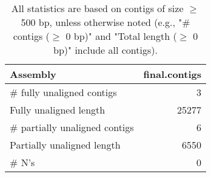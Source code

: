 \documentclass[12pt,a4paper]{article}
\begin{document}
\begin{table}[ht]
\begin{center}
\caption{All statistics are based on contigs of size $\geq$ 500 bp, unless otherwise noted (e.g., "\# contigs ($\geq$ 0 bp)" and "Total length ($\geq$ 0 bp)" include all contigs).}
\begin{tabular}{|l*{1}{|r}|}
\hline
Assembly & final.contigs \\ \hline
\# fully unaligned contigs & 3 \\ \hline
Fully unaligned length & 25277 \\ \hline
\# partially unaligned contigs & 6 \\ \hline
Partially unaligned length & 6550 \\ \hline
\# N's & 0 \\ \hline
\end{tabular}
\end{center}
\end{table}
\end{document}
